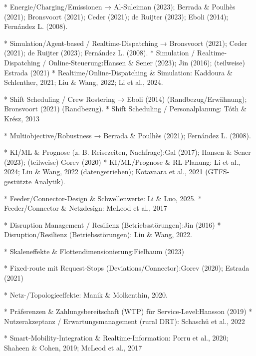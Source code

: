 * Energie/Charging/Emissionen → Al-Suleiman (2023); Berrada \& Poulhès (2021); Bronsvoort (2021); Ceder (2021); de Ruijter (2023); Eboli (2014); Fernández L. (2008).





* Simulation/Agent-based / Realtime-Dispatching → Bronsvoort (2021); Ceder (2021); de Ruijter (2023); Fernández L. (2008).
* Simulation / Realtime-Dispatching /  Online-Steuerung:Hansen \& Sener (2023); Jin (2016); (teilweise) Estrada (2021)
* Realtime/Online-Dispatching \& Simulation: Kaddoura \& Schlenther, 2021; Liu \& Wang, 2022; Li et al., 2024.





* Shift Scheduling / Crew Rostering → Eboli (2014) (Randbezug/Erwähnung); Bronsvoort (2021) (Randbezug).
* Shift Scheduling / Personalplanung: Tóth \& Krész, 2013



* Multiobjective/Robustness → Berrada \& Poulhès (2021); Fernández L. (2008).



* KI/ML \& Prognose (z. B. Reisezeiten, Nachfrage):Gal (2017); Hansen \& Sener (2023); (teilweise) Gorev (2020)
* KI/ML/Prognose \& RL-Planung: Li et al., 2024; Liu \& Wang, 2022 (datengetrieben); Kotavaara et al., 2021 (GTFS-gestützte Analytik).




* Feeder/Connector-Design \& Schwellenwerte: Li \& Luo, 2025.
* Feeder/Connector \& Netzdesign: McLeod et al., 2017




* Disruption Management / Resilienz (Betriebsstörungen):Jin (2016)
* Disruption/Resilienz (Betriebsstörungen): Liu \& Wang, 2022.




* Skaleneffekte \& Flottendimensionierung:Fielbaum (2023)



* Fixed-route mit Request-Stops (Deviations/Connector):Gorev (2020); Estrada (2021)



* Netz-/Topologieeffekte: Manik \& Molkenthin, 2020.

* Präferenzen \& Zahlungsbereitschaft (WTP) für Service-Level:Hansson (2019)
* Nutzerakzeptanz / Erwartungsmanagement (rural DRT): Schaschü et al., 2022

* Smart-Mobility-Integration \& Realtime-Information: Porru et al., 2020; Shaheen \& Cohen, 2019; McLeod et al., 2017




